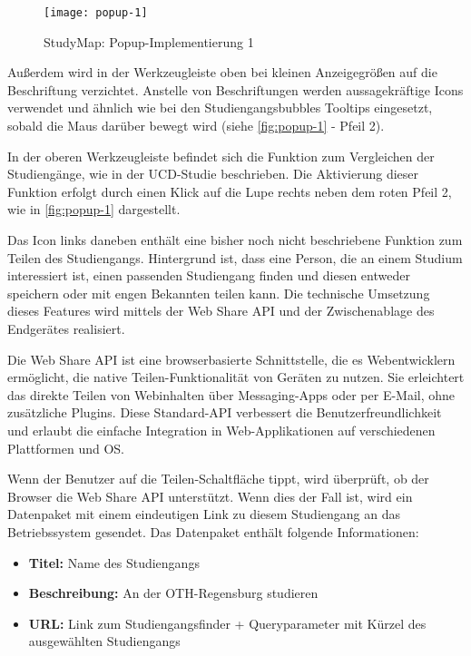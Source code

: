 \begin{figure}[H]
    \centering
    \texttt{[image: popup-1]}
    \caption{StudyMap: Popup-Implementierung 1}
    \label{fig:popup-1}
\end{figure}

Außerdem wird in der Werkzeugleiste oben bei kleinen Anzeigegrößen auf die Beschriftung verzichtet. Anstelle von Beschriftungen werden aussagekräftige Icons verwendet und ähnlich wie bei den Studiengangsbubbles Tooltips eingesetzt, sobald die Maus darüber bewegt wird (siehe \autoref{fig:popup-1} - Pfeil 2).

In der oberen Werkzeugleiste befindet sich die Funktion zum Vergleichen der Studiengänge, wie in der UCD-Studie beschrieben. Die Aktivierung dieser Funktion erfolgt durch einen Klick auf die Lupe rechts neben dem roten Pfeil 2, wie in \autoref{fig:popup-1} dargestellt.

Das Icon links daneben enthält eine bisher noch nicht beschriebene Funktion zum Teilen des Studiengangs. Hintergrund ist, dass eine Person, die an einem Studium interessiert ist, einen passenden Studiengang finden und diesen entweder speichern oder mit engen Bekannten teilen kann. Die technische Umsetzung dieses Features wird mittels der Web Share API und der Zwischenablage des Endgerätes realisiert.

Die Web Share API ist eine browserbasierte Schnittstelle, die es Webentwicklern ermöglicht, die native Teilen-Funktionalität von Geräten zu nutzen. Sie erleichtert das direkte Teilen von Webinhalten über Messaging-Apps oder per E-Mail, ohne zusätzliche Plugins. Diese Standard-API verbessert die Benutzerfreundlichkeit und erlaubt die einfache Integration in Web-Applikationen auf verschiedenen Plattformen und OS. \parencite{mozilla_corporation_web_2023}

Wenn der Benutzer auf die Teilen-Schaltfläche tippt, wird überprüft, ob der Browser die Web Share API unterstützt. Wenn dies der Fall ist, wird ein Datenpaket mit einem eindeutigen Link zu diesem Studiengang an das Betriebssystem gesendet. Das Datenpaket enthält folgende Informationen:
\begin{itemize}
    \item \textbf{Titel:} Name des Studiengangs
    \item \textbf{Beschreibung:} \glqq An der OTH-Regensburg studieren\grqq{}
    \item \textbf{URL:} Link zum Studiengangsfinder + Queryparameter mit Kürzel des ausgewählten Studiengangs
\end{itemize}

